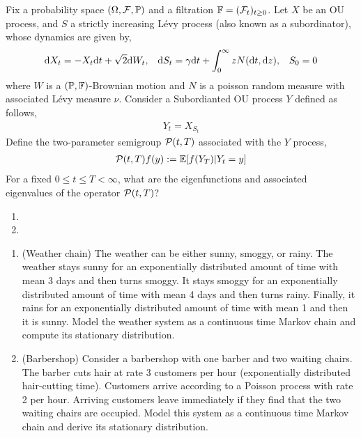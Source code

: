 \begin{problem}
    Fix a probability space \( (\Omega,\mathcal{F},\mathbb{P}) \) and a filtration \( \mathbb{F} = (\mathcal{F}_t)_{t\geq 0} \). Let \( X \) be an OU process, and \( S \) a strictly increasing L\'evy process (also known as a subordinator), whose dynamics are given by,
    \begin{align*}
        \mathrm{d} X_t = - X_t \mathrm{d} t + \sqrt{2}\mathrm{d} W_t, && \mathrm{d} S_t = \gamma \mathrm{d} t + \int_0^\infty z N(\mathrm{d} t,\mathrm{d} z), && S_0 = 0
    \end{align*}
    where \( W \) is a \( (\mathbb{P},\mathbb{F}) \)-Brownian motion and \( N \) is a poisson random measure with associated L\'evy measure \( \nu \). Consider a Subordianted OU process \( Y \) defined as follows,
    \begin{align*}
        Y_t = X_{S_t}
    \end{align*}
    Define the two-parameter semigroup \( \mathcal{P}(t,T) \) associated with the \( Y \) process,
    \begin{align*}
        \mathcal{P}(t,T) f(y) := \mathbb{E}[f(Y_T) | Y_t = y]
    \end{align*}
    For a fixed \( 0\leq t\leq T <\infty \), what are the eigenfunctions and associated eigenvalues of the operator \( \mathcal{P}(t,T) \)?
\end{problem}

\begin{solution}[Solution]
\begin{enumerate}[label=(\alph*)]
    \item 
    \item 
\end{enumerate}
\end{solution}


\begin{problem}
\begin{enumerate}[nolistsep,label=(\alph*)]
    \item (Weather chain) The weather can be either sunny, smoggy, or rainy. The weather stays sunny for an exponentially distributed amount of time with mean 3 days and then turns smoggy. It stays smoggy for an exponentially distributed amount of time with mean 4 days and then turns rainy. Finally, it rains for an exponentially distributed amount of time with mean 1 and then it is sunny. Model the weather system as a continuous time Markov chain and compute its stationary distribution.
    \item (Barbershop) Consider a barbershop with one barber and two waiting chairs. The barber cuts hair at rate 3 customers per hour (exponentially distributed hair-cutting time). Customers arrive according to a Poisson process with rate 2 per hour. Arriving customers leave immediately if they find that the two waiting chairs are occupied. Model this system as a continuous time Markov chain and derive its stationary distribution.
\end{enumerate}
\end{problem}

